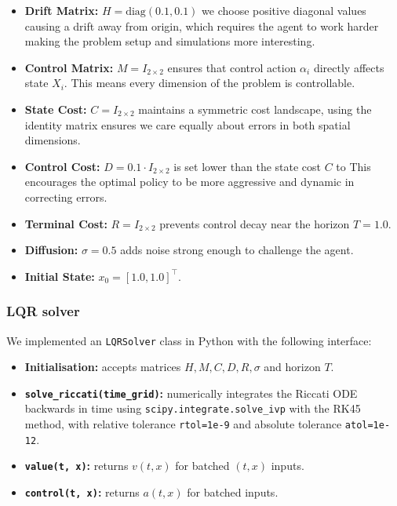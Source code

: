 \documentclass[12pt, a4paper]{article}
\begin{document}
\begin{itemize}
\item \textbf{Drift Matrix:} $H = \text{diag}(0.1, 0.1)$ we choose positive diagonal values causing a drift away from origin, which requires the agent to work harder making the problem setup and simulations more interesting.
\item \textbf{Control Matrix:} $M = I_{2 \times 2}$ ensures that control action $\alpha_i$ directly affects state $X_i$. This means every dimension of the problem is controllable.
\item \textbf{State Cost:} $C = I_{2 \times 2}$ maintains a symmetric cost landscape, using the identity matrix ensures we care equally about errors in both spatial dimensions.
\item \textbf{Control Cost:} $D = 0.1 \cdot I_{2 \times 2}$ is set lower than the state cost $C$ to This encourages the optimal policy to be more aggressive and dynamic in correcting errors.
\item \textbf{Terminal Cost:} $R = I_{2 \times 2}$ prevents control decay near the horizon $T = 1.0$.
\item \textbf{Diffusion:} $\sigma = 0.5$ adds noise strong enough to challenge the agent.
\item \textbf{Initial State:} $x_0 = [1.0, 1.0]^\top$.
\end{itemize}

\subsubsection{LQR solver}
\label{subsec:ex1.1}


We implemented an \texttt{LQRSolver} class in Python with the following interface:
\begin{itemize}
    \item \textbf{Initialisation:} accepts matrices $H, M, C, D, R, \sigma$ and horizon $T$.
    \item \textbf{\texttt{solve\_riccati(time\_grid)}:} numerically integrates the Riccati ODE backwards in time using \texttt{scipy.integrate.solve\_ivp} with the RK45 method, with relative tolerance \texttt{rtol=1e-9} and absolute tolerance \texttt{atol=1e-12}.
    \item \textbf{\texttt{value(t, x)}:} returns $v(t,x)$ for batched $(t,x)$ inputs.
    \item \textbf{\texttt{control(t, x)}:} returns $a(t,x)$ for batched inputs.
\end{itemize}
\end{document}
